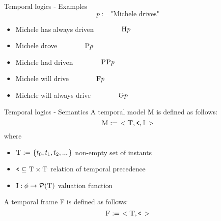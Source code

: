 \documentclass{beamer}
\begin{document}
\begin{frame}{Temporal logics - Examples}
    $$p := \text{"Michele drives"}$$
    \begin{itemize}
        \item Michele has always driven\tab $\hspace{40pt} \textsc{H}p$\medskip
        \item Michele drove\tab $\hspace{40pt} \textsc{P}p$\medskip
        \item Michele had driven\tab $\hspace{40pt} \textsc{PP}p$\medskip
        \item Michele will drive\tab $\hspace{40pt} \textsc{F}p$\medskip
        \item Michele will always drive\tab $\hspace{40pt} \textsc{G}p$
    \end{itemize}
\end{frame}

\begin{frame}{Temporal logics - Semantics}
    A temporal model \textsc{M} is defined as follows:
    $$\textsc{M} := \left.<\textsc{T}, \texttt{<}, \textsc{I}\right.>$$
    where
    \begin{itemize}
        \item $\textsc{T} := \left.\{t_0, t_1, t_2, ... \right.\}$ non-empty set of instants
        \item $\texttt{<} \subseteq \textsc{T}\times\textsc{T}$ relation of temporal precedence
        \item $\textsc{I}: \phi \to \mathcal{P}(\textsc{T})$ valuation function
    \end{itemize}
    \endgraf
    \bigskip
    A temporal frame \textsc{F} is defined as follows:
    $$\textsc{F} := \left.<\textsc{T}, \texttt{<}\right.>$$
\end{frame}
\end{document}
